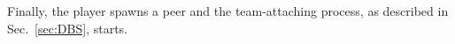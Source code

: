 Finally, the player spawns a peer and the team-attaching process, as
described in Sec.~\ref{sec:DBS}, starts.

